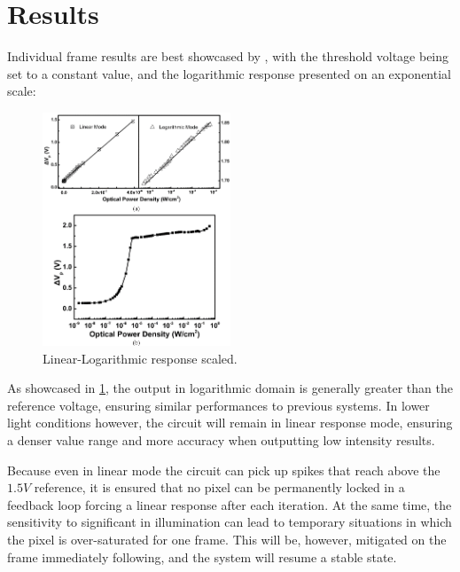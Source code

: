 \section{Results}

Individual frame results are best showcased by \cite{withCompensation}, with the threshold voltage being
set to a constant value, and the logarithmic response presented on an exponential scale:

\begin{figure}[H]
    \includegraphics[width=0.50\textwidth, height=0.75\textwidth]{resources/png/response.png}
    \caption{Linear-Logarithmic response scaled. \cite{withCompensation} \label{figResponse}}
\end{figure}

As showcased in \ref{figResponse}, the output in logarithmic domain is generally greater than the reference
voltage, ensuring similar performances to previous systems. In lower light conditions however, the circuit
will remain in linear response mode, ensuring a denser value range and more accuracy when outputting low
intensity results.

Because even in linear mode the circuit can pick up spikes that reach above the \(1.5V\) reference, it is 
ensured that no pixel can be permanently locked in a feedback loop forcing a linear response after each 
iteration. At the same time, the sensitivity to significant in illumination can lead to temporary situations
in which the pixel is over-saturated for one frame. This will be, however, mitigated on the frame immediately
following, and the system will resume a stable state.


